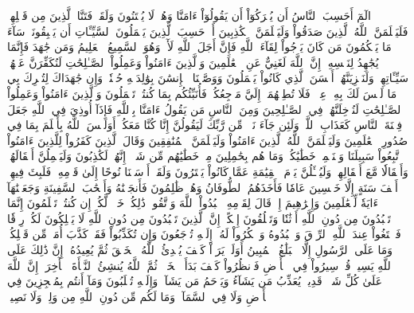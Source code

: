 الٓمٓ
أَحَسِبَ ٱلنَّاسُ أَن يُتۡرَكُوٓاْ أَن يَقُولُوٓاْ ءَامَنَّا وَهُمۡ لَا يُفۡتَنُونَ
وَلَقَدۡ فَتَنَّا ٱلَّذِينَ مِن قَبۡلِهِمۡۖ فَلَيَعۡلَمَنَّ ٱللَّهُ ٱلَّذِينَ صَدَقُواْ وَلَيَعۡلَمَنَّ ٱلۡكَٰذِبِينَ
أَمۡ حَسِبَ ٱلَّذِينَ يَعۡمَلُونَ ٱلسَّيِّـَٔاتِ أَن يَسۡبِقُونَاۚ سَآءَ مَا يَحۡكُمُونَ
مَن كَانَ يَرۡجُواْ لِقَآءَ ٱللَّهِ فَإِنَّ أَجَلَ ٱللَّهِ لَأٓتٖۚ وَهُوَ ٱلسَّمِيعُ ٱلۡعَلِيمُ
وَمَن جَٰهَدَ فَإِنَّمَا يُجَٰهِدُ لِنَفۡسِهِۦٓۚ إِنَّ ٱللَّهَ لَغَنِيٌّ عَنِ ٱلۡعَٰلَمِينَ
وَٱلَّذِينَ ءَامَنُواْ وَعَمِلُواْ ٱلصَّـٰلِحَٰتِ لَنُكَفِّرَنَّ عَنۡهُمۡ سَيِّـَٔاتِهِمۡ وَلَنَجۡزِيَنَّهُمۡ أَحۡسَنَ ٱلَّذِي كَانُواْ يَعۡمَلُونَ
وَوَصَّيۡنَا ٱلۡإِنسَٰنَ بِوَٰلِدَيۡهِ حُسۡنٗاۖ وَإِن جَٰهَدَاكَ لِتُشۡرِكَ بِي مَا لَيۡسَ لَكَ بِهِۦ عِلۡمٞ فَلَا تُطِعۡهُمَآۚ إِلَيَّ مَرۡجِعُكُمۡ فَأُنَبِّئُكُم بِمَا كُنتُمۡ تَعۡمَلُونَ
وَٱلَّذِينَ ءَامَنُواْ وَعَمِلُواْ ٱلصَّـٰلِحَٰتِ لَنُدۡخِلَنَّهُمۡ فِي ٱلصَّـٰلِحِينَ
وَمِنَ ٱلنَّاسِ مَن يَقُولُ ءَامَنَّا بِٱللَّهِ فَإِذَآ أُوذِيَ فِي ٱللَّهِ جَعَلَ فِتۡنَةَ ٱلنَّاسِ كَعَذَابِ ٱللَّهِۖ وَلَئِن جَآءَ نَصۡرٞ مِّن رَّبِّكَ لَيَقُولُنَّ إِنَّا كُنَّا مَعَكُمۡۚ أَوَلَيۡسَ ٱللَّهُ بِأَعۡلَمَ بِمَا فِي صُدُورِ ٱلۡعَٰلَمِينَ
وَلَيَعۡلَمَنَّ ٱللَّهُ ٱلَّذِينَ ءَامَنُواْ وَلَيَعۡلَمَنَّ ٱلۡمُنَٰفِقِينَ
وَقَالَ ٱلَّذِينَ كَفَرُواْ لِلَّذِينَ ءَامَنُواْ ٱتَّبِعُواْ سَبِيلَنَا وَلۡنَحۡمِلۡ خَطَٰيَٰكُمۡ وَمَا هُم بِحَٰمِلِينَ مِنۡ خَطَٰيَٰهُم مِّن شَيۡءٍۖ إِنَّهُمۡ لَكَٰذِبُونَ
وَلَيَحۡمِلُنَّ أَثۡقَالَهُمۡ وَأَثۡقَالٗا مَّعَ أَثۡقَالِهِمۡۖ وَلَيُسۡـَٔلُنَّ يَوۡمَ ٱلۡقِيَٰمَةِ عَمَّا كَانُواْ يَفۡتَرُونَ
وَلَقَدۡ أَرۡسَلۡنَا نُوحًا إِلَىٰ قَوۡمِهِۦ فَلَبِثَ فِيهِمۡ أَلۡفَ سَنَةٍ إِلَّا خَمۡسِينَ عَامٗا فَأَخَذَهُمُ ٱلطُّوفَانُ وَهُمۡ ظَٰلِمُونَ
فَأَنجَيۡنَٰهُ وَأَصۡحَٰبَ ٱلسَّفِينَةِ وَجَعَلۡنَٰهَآ ءَايَةٗ لِّلۡعَٰلَمِينَ
وَإِبۡرَٰهِيمَ إِذۡ قَالَ لِقَوۡمِهِ ٱعۡبُدُواْ ٱللَّهَ وَٱتَّقُوهُۖ ذَٰلِكُمۡ خَيۡرٞ لَّكُمۡ إِن كُنتُمۡ تَعۡلَمُونَ
إِنَّمَا تَعۡبُدُونَ مِن دُونِ ٱللَّهِ أَوۡثَٰنٗا وَتَخۡلُقُونَ إِفۡكًاۚ إِنَّ ٱلَّذِينَ تَعۡبُدُونَ مِن دُونِ ٱللَّهِ لَا يَمۡلِكُونَ لَكُمۡ رِزۡقٗا فَٱبۡتَغُواْ عِندَ ٱللَّهِ ٱلرِّزۡقَ وَٱعۡبُدُوهُ وَٱشۡكُرُواْ لَهُۥٓۖ إِلَيۡهِ تُرۡجَعُونَ
وَإِن تُكَذِّبُواْ فَقَدۡ كَذَّبَ أُمَمٞ مِّن قَبۡلِكُمۡۖ وَمَا عَلَى ٱلرَّسُولِ إِلَّا ٱلۡبَلَٰغُ ٱلۡمُبِينُ
أَوَلَمۡ يَرَوۡاْ كَيۡفَ يُبۡدِئُ ٱللَّهُ ٱلۡخَلۡقَ ثُمَّ يُعِيدُهُۥٓۚ إِنَّ ذَٰلِكَ عَلَى ٱللَّهِ يَسِيرٞ
قُلۡ سِيرُواْ فِي ٱلۡأَرۡضِ فَٱنظُرُواْ كَيۡفَ بَدَأَ ٱلۡخَلۡقَۚ ثُمَّ ٱللَّهُ يُنشِئُ ٱلنَّشۡأَةَ ٱلۡأٓخِرَةَۚ إِنَّ ٱللَّهَ عَلَىٰ كُلِّ شَيۡءٖ قَدِيرٞ
يُعَذِّبُ مَن يَشَآءُ وَيَرۡحَمُ مَن يَشَآءُۖ وَإِلَيۡهِ تُقۡلَبُونَ
وَمَآ أَنتُم بِمُعۡجِزِينَ فِي ٱلۡأَرۡضِ وَلَا فِي ٱلسَّمَآءِۖ وَمَا لَكُم مِّن دُونِ ٱللَّهِ مِن وَلِيّٖ وَلَا نَصِيرٖ
